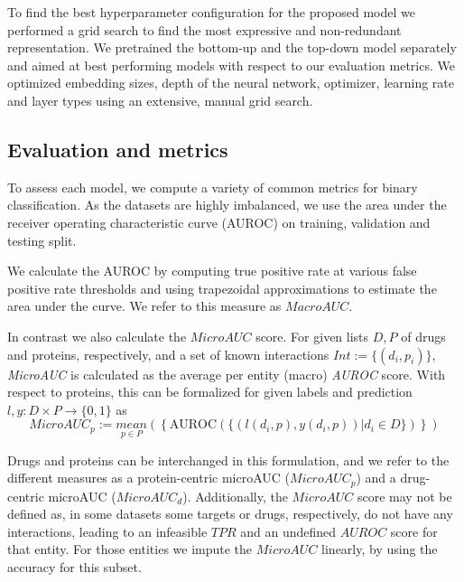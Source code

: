 \documentclass{bioinfo}
\begin{document}
To find the best hyperparameter configuration for the proposed model
we performed a grid search to find the most expressive and
non-redundant representation. We pretrained the bottom-up and the
top-down model separately and aimed at best performing models
with respect to our evaluation metrics. We optimized embedding sizes,
depth of the neural network, optimizer, learning rate and layer types
using an extensive, manual grid search. 

\subsection{Evaluation and metrics}

To assess each model, we compute a variety of common metrics for
binary classification. As the datasets are highly imbalanced, we use
the area under the receiver operating characteristic curve
(AUROC) on training, validation and testing split. %

We calculate the AUROC by computing true positive rate at various
false positive rate thresholds and using trapezoidal approximations to
estimate the area under the curve. We refer to this measure as
$MacroAUC$.

In contrast we also calculate the $MicroAUC$ score. For given lists $D, P$ of drugs and proteins, respectively, and a set of known interactions $Int := \{(d_i, p_i) \}$, \textit{MicroAUC} is calculated as the average per entity (macro) \textit{AUROC} score. With respect to proteins, this can be formalized for given labels and prediction $l,y:D\times P \rightarrow \{0,1\}$  as 
\begin{equation*}
	MicroAUC_p := \underset{p\in P}{mean}\left(\left\{ \text{AUROC}(\{ (l(d_i, p), y(d_i,p))| d_i\in D\}) \right\}\right)
\end{equation*}

Drugs and proteins can be interchanged in this formulation, and we
refer to the different measures as a protein-centric microAUC
($MicroAUC_p$) and a drug-centric microAUC
($MicroAUC_d$). Additionally, the $MicroAUC$ score may not be defined
as, in some datasets some targets or drugs, respectively, do not have
any interactions, leading to an infeasible $TPR$ and an undefined
$AUROC$ score for that entity.
 For
those entities we impute the $MicroAUC$ linearly, by using the
accuracy for this subset.
\end{document}
